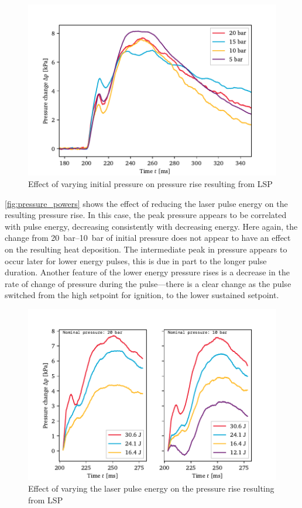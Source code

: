             \begin{figure}[h]
                \centering
                \includegraphics[]{assets/5 results/pressure_pressures}
                \caption{Effect of varying initial pressure on pressure rise resulting from LSP}
                \label{fig:pressure_pressures}
            \end{figure}

            \autoref{fig:pressure_powers} shows the effect of reducing the laser pulse energy on the resulting pressure rise. In this case, the peak pressure appears to be correlated with pulse energy, decreasing consistently with decreasing energy. Here again, the change from \qtyrange{20}{10}{bar} of initial pressure does not appear to have an effect on the resulting heat deposition. The intermediate peak in pressure appears to occur later for lower energy pulses, this is due in part to the longer pulse duration. Another feature of the lower energy pressure rises is a decrease in the rate of change of pressure during the pulse---there is a clear change as the pulse switched from the high setpoint for ignition, to the lower sustained setpoint.

            \begin{figure}[h]
                \centering
                \includegraphics[]{assets/5 results/pressure_powers}
                \caption{Effect of varying the laser pulse energy on the pressure rise resulting from LSP}
                \label{fig:pressure_powers}
            \end{figure}

